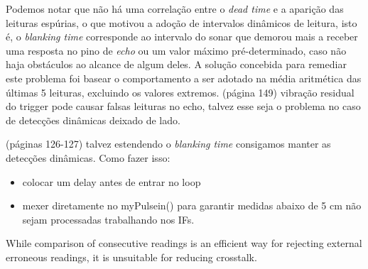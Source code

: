 Podemos notar que não há uma correlação entre o \textit{dead time} e a aparição das leituras espúrias, o que motivou a adoção de intervalos dinâmicos 
de leitura, isto é, o \textit{blanking time} corresponde ao intervalo do sonar que demorou mais a receber uma resposta no pino de \textit{echo} ou um 
 valor máximo pré-determinado, caso não haja obstáculos ao alcance de algum deles.
A solução concebida para remediar este problema foi basear o comportamento a ser adotado na média aritmética das últimas 5 leituras, excluindo os 
valores extremos.
\cite{jones}(página 149) vibração residual do trigger pode causar falsas leituras no echo, talvez esse seja o problema no caso de detecções dinâmicas 
deixado de lado.

\cite{siegwart} (páginas 126-127) talvez estendendo o \textit{blanking time} consigamos manter as detecções dinâmicas. Como fazer isso:
\begin{itemize}
 \item colocar um delay antes de entrar no loop
 \item mexer diretamente no myPulsein() para garantir medidas abaixo de 5 cm não sejam processadas trabalhando nos IFs. 
\end{itemize}

 While comparison of consecutive readings is an efficient way for rejecting external
 erroneous readings, it is unsuitable for reducing crosstalk. \cite{2016_artigo_1}

